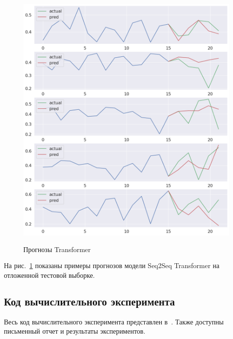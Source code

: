 \begin{figure}[H]\center
{\includegraphics[width=1.0\textwidth]{results/example_transformer.png}}
\caption{Прогнозы Transformer}
\label{example_transformer}
\end{figure}

На рис.~\ref{example_transformer} показаны примеры прогнозов модели Seq2Seq Transformer на отложенной тестовой выборке.

\newpage

\subsection{Код вычислительного эксперимента}

Весь код вычислительного эксперимента представлен в~\cite{Github}. Также доступны письменный отчет и результаты экспериментов.